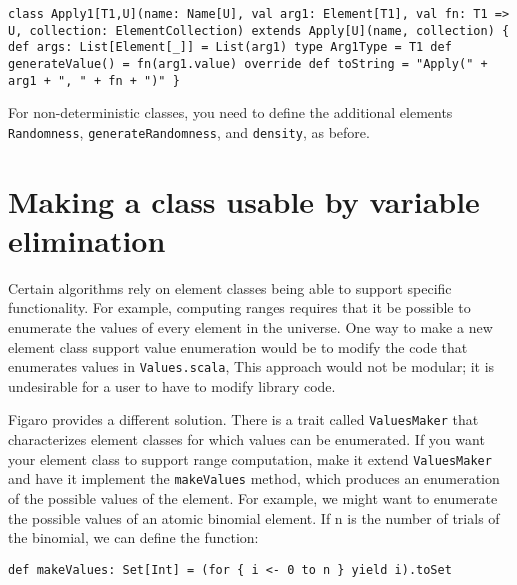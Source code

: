 \begin{flushleft}
\texttt{class Apply1[T1,U](name: Name[U], val arg1: Element[T1], val fn: T1
=> U, collection: ElementCollection)
\newline extends Apply[U](name, collection) \{
\newline \tab def args: List[Element[\_]] = List(arg1)
\newline 
\newline \tab type Arg1Type = T1
\newline 
\newline \tab def generateValue() = fn(arg1.value)
\newline 
\newline \tab override def toString = "Apply(" + arg1 + ", " + fn + ")"
\newline \}
}
\end{flushleft}

For non-deterministic classes, you need to define the additional elements \texttt{Randomness}, \texttt{generateRandomness}, and \texttt{density}, as before.

\section{Making a class usable by variable elimination}

Certain algorithms rely on element classes being able to support specific functionality. For example, computing ranges requires that it be possible to enumerate the values of every element in the universe. One way to make a new element class support value enumeration would be to modify the code that enumerates values in \texttt{Values.scala}, This approach would not be modular; it is undesirable for a user to have to modify library code.

Figaro provides a different solution. There is a trait called \texttt{ValuesMa\-ker} that characterizes element classes for which values can be enumerated. If you want your element class to support range computation, make it extend \texttt{ValuesMaker} and have it implement the \texttt{makeValues} method, which produces an enumeration of the possible values of the element. For example, we might want to enumerate the possible values of an atomic binomial element. If n is the number of trials of the binomial, we can define the function:

\begin{flushleft}
\texttt{def makeValues: Set[Int] = (for \{ i <- 0 to n \} yield i).toSet}
\end{flushleft}

